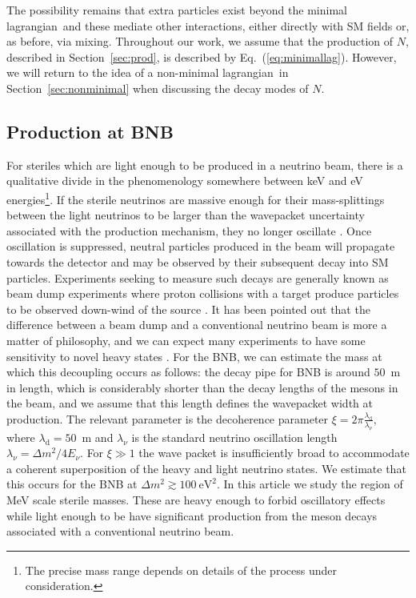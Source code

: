 \documentclass[11pt, a4paper]{article}
\newcommand{\refeq}[1]{Eq.~(\ref{#1})}
\newcommand{\refsec}[1]{Section~\ref{#1}}
\def\lagrangian{lagrangian}
\begin{document}
The possibility remains that extra particles exist beyond the minimal
\lagrangian\ and these mediate other interactions, either directly with SM
fields or, as before, via mixing. 
%
Throughout our work, we assume that the production of $N$, described in
\refsec{sec:prod}, is described by \refeq{eq:minimallag}. However, we will
return to the idea of a non-minimal \lagrangian\ in \refsec{sec:nonminimal}
when discussing the decay modes of $N$.

\subsection{\label{sec:prod}Production at BNB}

For steriles which are light enough to be produced in a neutrino beam, there is
a qualitative divide in the phenomenology somewhere between keV and eV
energies\footnote{The precise mass range depends on details of the process
under consideration.}. If the sterile neutrinos are massive enough for their
mass-splittings between the light neutrinos to be larger than the wavepacket
uncertainty associated with the production mechanism, they no longer oscillate
\cite{Akhmedov:2009rb}.  
%
Once oscillation is suppressed, neutral particles produced in the beam will
propagate towards the detector and may be observed by their subsequent decay
into SM particles. Experiments seeking to measure such decays are generally
known as beam dump experiments where proton collisions with a target produce
particles to be observed down-wind of the source \cite{CooperSarkar:1985nh,
Bergsma:1985is, Vaitaitis:1999wq, Bernardi:1985ny, Bernardi:1987ek,
Anelli:2015pba, Alekhin:2015byh}. It has been pointed out that the difference
between a beam dump and a conventional neutrino beam is more a matter of
philosophy, and we can expect many experiments to have some sensitivity to
novel heavy states \cite{Gorbunov:2007ak, Asaka:2012bb, Adams:2013qkq}. 
%
For the BNB, we can estimate the mass at which this decoupling occurs as
follows: the decay pipe for BNB is around $50$~m in length, which is
considerably shorter than the decay lengths of the mesons in the beam, and we
assume that this length defines the wavepacket width at production.  The
relevant parameter is the decoherence parameter \cite{Akhmedov:2009rb,
Hernandez:2011rs}
%
$\xi = 2\pi \frac{\lambda_\text{d}}{\lambda_\nu},$
%
where $\lambda_\text{d} = 50$~m and $\lambda_\nu$ is the standard neutrino
oscillation length $\lambda_\nu = \Delta m^2/4E_\nu$. For $\xi\gg1$ the wave
packet is insufficiently broad to accommodate a coherent superposition of the
heavy and light neutrino states. We estimate that this occurs for the BNB at 
%
$ \Delta m^2 \gtrsim 100~\text{eV}^2.$
%
In this article we study the region of MeV scale sterile masses. These are
heavy enough to forbid oscillatory effects while light enough to be have
significant production from the meson decays associated with a conventional
neutrino beam. 
\end{document}
